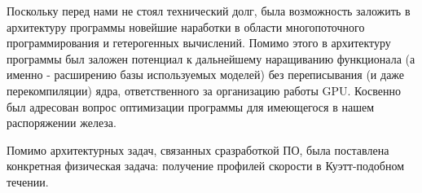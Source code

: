         Поскольку перед нами не стоял технический долг, была возможность заложить в архитектуру программы новейшие наработки в области многопоточного программирования и гетерогенных вычислений. Помимо этого в архитектуру программы был заложен потенциал к дальнейшему наращиванию функционала (а именно - расширению базы используемых моделей) без переписывания (и даже перекомпиляции) ядра, ответственного за организацию работы GPU. Косвенно был адресован вопрос оптимизации программы для имеющегося в нашем распоряжении железа.

        Помимо архитектурных задач, связанных сразработкой ПО, была поставлена конкретная физическая задача: получение профилей скорости в Куэтт-подобном течении.
